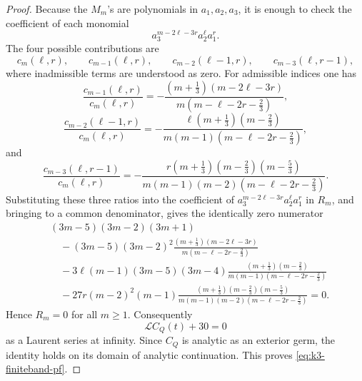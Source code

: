 \documentclass[10pt,a4paper]{amsart}
\begin{document}
\begin{proof}
Because the \(M_m\)'s are polynomials in \(a_1,a_2,a_3\), it is enough to check
the coefficient of each monomial
\[
        a_3^{m-2\ell-3r}a_2^\ell a_1^r .
\]
The four possible contributions are
\[
        c_m(\ell,r),\qquad
        c_{m-1}(\ell,r),\qquad
        c_{m-2}(\ell-1,r),\qquad
        c_{m-3}(\ell,r-1),
\]
where inadmissible terms are understood as zero.  For admissible indices one has
\[
        \frac{c_{m-1}(\ell,r)}{c_m(\ell,r)}
        =
        -\frac{(m+\frac13)(m-2\ell-3r)}
        {m(m-\ell-2r-\frac23)},
\]
\[
        \frac{c_{m-2}(\ell-1,r)}{c_m(\ell,r)}
        =
        -\frac{\ell(m+\frac13)(m-\frac23)}
        {m(m-1)(m-\ell-2r-\frac23)},
\]
and
\[
        \frac{c_{m-3}(\ell,r-1)}{c_m(\ell,r)}
        =
        -\frac{r(m+\frac13)(m-\frac23)(m-\frac53)}
        {m(m-1)(m-2)(m-\ell-2r-\frac23)} .
\]
Substituting these three ratios into the coefficient of
\(a_3^{m-2\ell-3r}a_2^\ell a_1^r\) in \(R_m\), and bringing to a common
denominator, gives the identically zero numerator
\[
\begin{split}
& (3m-5)(3m-2)(3m+1) \\
&\quad
-(3m-5)(3m-2)^2
        \frac{(m+\frac13)(m-2\ell-3r)}
        {m(m-\ell-2r-\frac23)} \\
&\quad
-3\ell(m-1)(3m-5)(3m-4)
        \frac{(m+\frac13)(m-\frac23)}
        {m(m-1)(m-\ell-2r-\frac23)} \\
&\quad
-27r(m-2)^2(m-1)
        \frac{(m+\frac13)(m-\frac23)(m-\frac53)}
        {m(m-1)(m-2)(m-\ell-2r-\frac23)}
        =0 .
\end{split}
\]
Hence \(R_m=0\) for all \(m\ge1\).  Consequently
\[
        \mathcal L C_Q(t)+30=0
\]
as a Laurent series at infinity.  Since \(C_Q\) is analytic as an exterior germ,
the identity holds on its domain of analytic continuation.  This proves
\eqref{eq:k3-finiteband-pf}.
\end{proof}
\end{document}
